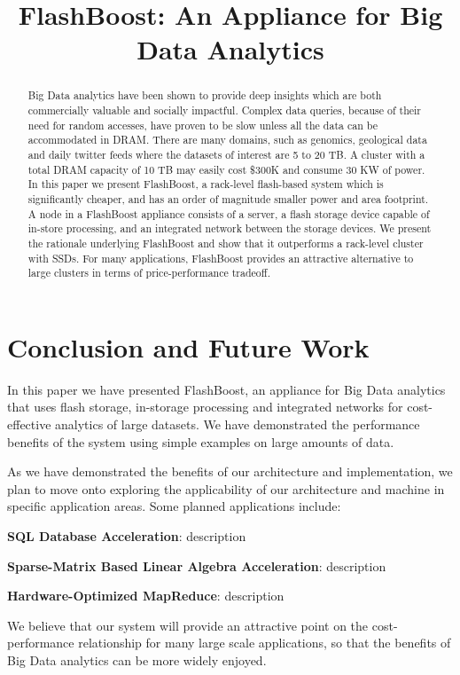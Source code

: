 \documentclass[pageno]{jpaper}
\begin{document}
\title{
FlashBoost: An Appliance for Big Data Analytics
}

\date{}
\maketitle


\begin{abstract}
Big Data analytics have been shown to provide deep insights which are both
commercially valuable and socially impactful. Complex data queries, because of
their need for random accesses, have proven to be slow unless all the data can
be accommodated in DRAM. There are many domains, such as genomics, geological
data and daily twitter feeds where the datasets of interest are 5 to 20 TB. A cluster with a
total DRAM capacity of 10 TB may easily cost \$300K and consume 30
KW of power. In this paper we present FlashBoost, a rack-level
flash-based system which is significantly cheaper, and has an order of magnitude
smaller power and area footprint. A node in a FlashBoost appliance consists of a
server, a flash storage device capable of in-store processing, and an integrated
network between the storage devices. We present the rationale underlying
FlashBoost and show that it outperforms a rack-level cluster with SSDs. For many
applications, FlashBoost provides an attractive alternative to large clusters in
terms of price-performance tradeoff.
\end{abstract}



%









\section{Conclusion and Future Work}

In this paper we have presented FlashBoost, an appliance for Big Data analytics
that uses flash storage, in-storage processing and integrated networks for
cost-effective analytics of large datasets. We have demonstrated the performance
benefits of the system using simple examples on large amounts of data.

As we have demonstrated the benefits of our architecture and implementation, we
plan to move onto exploring the applicability of our architecture and machine in
specific application areas. Some planned applications include:

\textbf{SQL Database Acceleration}: description

\textbf{Sparse-Matrix Based Linear Algebra Acceleration}: description

\textbf{Hardware-Optimized MapReduce}: description

We believe that our system will provide an attractive point on the
cost-performance relationship for many large scale applications, so that the
benefits of Big Data analytics can be more widely enjoyed.





\end{document}
